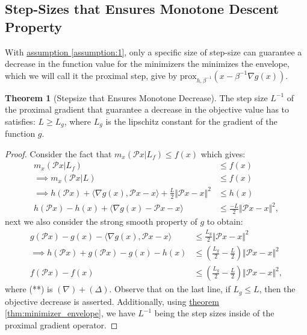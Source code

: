 \documentclass[]{article}
\theoremstyle{definition}
\newtheorem{theorem}{Theorem}       %
\begin{document}
    \subsection{Step-Sizes that Ensures Monotone Descent Property}
        With \hyperref[assumption:1]{assumption \ref*{assumption:1}}, only a specific size of step-size can guarantee a decrease in the function value for the minimizers the minimizes the envelope, which we will call it the proximal step, give by $\text{prox}_{h, \beta^{-1}}(x - \beta^{-1}\nabla g(x))$. 
        \begin{theorem}[Stepsize that Ensures Monotone Decrease]\label{thm:monotone_decrease}
            The step size $L^{-1}$ of the proximal gradient that guarantee a decrease in the objective value has to satisfies: $L \ge L_g$, where $L_g$ is the lipschitz constant for the gradient of the function $g$. 
        \end{theorem}
        \begin{proof}Consider the fact that $m_x(\mathcal Px|L_f)\le f(x)$ which gives: 
            \begin{align*}
                m_x(\mathcal Px|L_f) 
                &\le f(x)
                \\
                \implies 
                m_x(\mathcal Px|L) 
                &\le f(x)
                \\
                \implies h(\mathcal Px)+ 
                \langle \nabla g(x), \mathcal P x - x\rangle + \frac{L}{2}\Vert \mathcal Px - x\Vert^2 
                &\le h(x)
                \\
                h(\mathcal Px) - h(x) + \langle \nabla g(x) - \mathcal Px - x\rangle 
                &\le \frac{-L}{2} \Vert \mathcal Px - x\Vert^2, \tag{$\Delta$}
            \end{align*}
            next we also consider the strong smooth property of $g$ to obtain: 
            \begin{align*}
                g(\mathcal Px) - g(x) - \langle \nabla g(x), \mathcal Px - x\rangle 
                & \le \frac{L_g}{2}\Vert \mathcal Px - x\Vert^2 \tag{$\nabla$}
                \\
                \implies
                h(\mathcal Px) + g(\mathcal Px) - g(x) - h(x)
                &\le 
                \left(
                    \frac{L_g}{2} - \frac{L}{2}
                \right)\Vert \mathcal Px - x\Vert^2 \tag{**}
                \\
                f(\mathcal Px) - f(x) 
                &\le
                \left(
                    \frac{L_g}{2} - \frac{L}{2}
                \right)\Vert \mathcal Px - x\Vert^2, 
            \end{align*}
            where (**) is $(\nabla) + (\Delta)$. Observe that on the last line, if $L_g \le L$, then the objective decrease is asserted. Additionally, using \hyperref[thm:minimizer_envelope]{theorem \ref*{thm:minimizer_envelope}}, we have $L^{-1}$ being the step sizes inside of the proximal gradient operator. 
        \end{proof}
\end{document}
